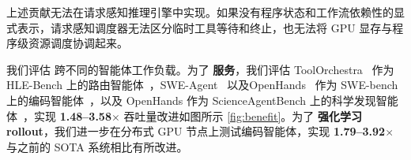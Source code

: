 上述贡献无法在请求感知推理引擎中实现。如果没有程序状态和工作流依赖性的显式表示，请求感知调度器无法区分临时工具等待和终止，也无法将 GPU 显存与程序级资源调度协调起来。


我们评估 \ouralg 跨不同的智能体工作负载。为了 \textbf{服务}，我们评估 ToolOrchestra~\citep{su2025toolorchestraelevatingintelligenceefficient} 作为 HLE-Bench 上的路由智能体~\citep{phan2025humanitysexam}，SWE-Agent~\citep{yang2024sweagentagentcomputerinterfacesenable} 以及OpenHands~\citep{wang2025openhandsopenplatformai} 作为 SWE-bench 上的编码智能体~\citep{jimenez2024swebenchlanguagemodelsresolve}，以及 OpenHands 作为 ScienceAgentBench 上的科学发现智能体~\citep{chen2024scienceagentbenchrigorousassessmentlanguage}，实现 \textbf{1.48--3.58$\times$} 吞吐量改进如图所示 \autoref{fig:benefit}。为了 \textbf{强化学习 rollout}，我们进一步在分布式 GPU 节点上测试编码智能体，实现  \textbf{1.79--3.92$\times$} 与之前的 SOTA 系统相比有所改进。


